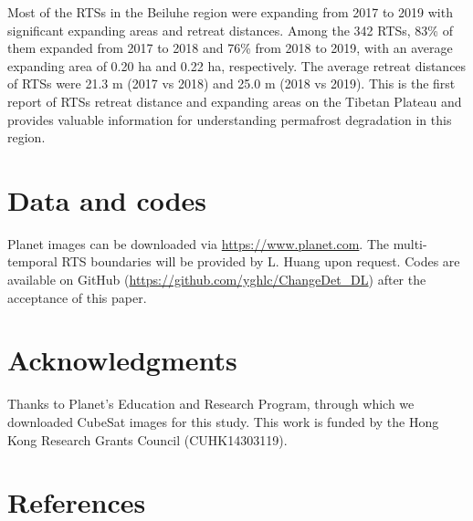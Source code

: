 \documentclass[authoryear,preprint,review,12pt]{elsarticle}
\begin{document}
Most of the RTSs in the Beiluhe region were expanding from 2017 to 2019 with significant expanding areas and retreat distances. 
Among the 342 RTSs, 83\% of them expanded from 2017 to 2018 and 76\% from 2018 to 2019, with an average expanding area of 0.20 ha and 0.22 ha, respectively.
The average retreat distances of RTSs were 21.3 m (2017 vs 2018) and 25.0 m (2018 vs 2019).
This is the first report of RTSs retreat distance and expanding areas on the Tibetan Plateau and provides valuable information for understanding permafrost degradation in this region. 


\section{Data and codes}
\label{sec_data_codes}

Planet images can be downloaded via \url{https://www.planet.com}. 
The multi-temporal RTS boundaries will be provided by L. Huang upon request. 
Codes are available on GitHub (\url{https://github.com/yghlc/ChangeDet_DL}) after the acceptance of this paper.

\section{Acknowledgments}
\label{sec_acknowledgments}


Thanks to Planet's Education and Research Program, through which we downloaded CubeSat images for this study. 
This work is funded by the Hong Kong Research Grants Council (CUHK14303119).




\section{References}
\label{sec_reference}

 
%



%
%
\end{document}
